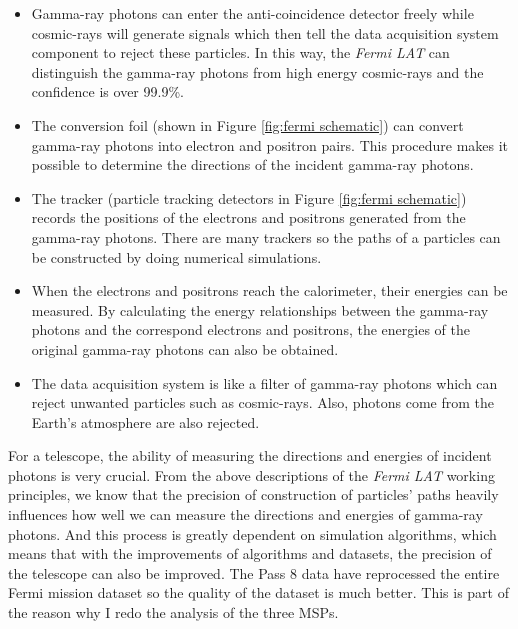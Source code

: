 \documentclass[12pt]{report}
\begin{document}
      \begin{itemize}
        \item Gamma-ray photons can enter the anti-coincidence detector freely while 
          cosmic-rays will generate signals which then tell the data acquisition system 
          component to reject these particles. In this way, the \textit{Fermi LAT} can 
          distinguish the gamma-ray photons from high energy cosmic-rays and the confidence 
          is over 99.9\%. 
        \item The conversion foil (shown in Figure \ref{fig:fermi schematic}) can convert  
          gamma-ray photons into electron and positron pairs. This procedure makes it 
          possible to determine the directions of the incident gamma-ray photons. 
        \item The tracker (particle tracking detectors in Figure \ref{fig:fermi schematic}) 
          records the positions of the electrons and positrons generated from the gamma-ray 
          photons. There are many trackers so the paths of a particles can be constructed by 
          doing numerical simulations.
        \item When the electrons and positrons reach the calorimeter, their energies can be
          measured. By calculating the energy relationships between the gamma-ray photons and 
          the correspond electrons and positrons, the energies of the original gamma-ray 
          photons can also be obtained. 
        \item The data acquisition system is like a filter of gamma-ray photons which can 
          reject unwanted particles such as cosmic-rays. Also, photons come from the Earth's 
          atmosphere are also rejected. 
      \end{itemize}

      For a telescope, the ability of measuring the directions and energies of incident 
      photons is very crucial. From the above descriptions of the \textit{Fermi LAT} 
      working principles, we know that the precision of construction of particles' paths 
      heavily influences how well we can measure the directions and energies of gamma-ray 
      photons. And this process is greatly dependent on simulation algorithms, which means 
      that with the improvements of algorithms and datasets,
      the precision of the telescope can also be improved. The Pass 8 data 
      have reprocessed the entire Fermi mission dataset so the quality of the dataset is much 
      better. This is part of the reason why I redo the analysis of the three MSPs.
\end{document}
